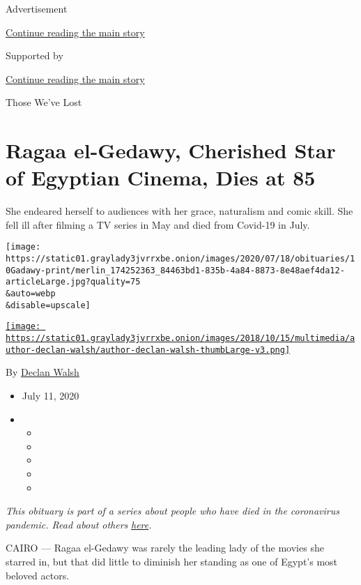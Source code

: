 Advertisement

\protect\hyperlink{after-top}{Continue reading the main story}

Supported by

\protect\hyperlink{after-sponsor}{Continue reading the main story}

Those We've Lost

\hypertarget{ragaa-el-gedawy-cherished-star-of-egyptian-cinema-dies-at-85}{%
\section{Ragaa el-Gedawy, Cherished Star of Egyptian Cinema, Dies at
85}\label{ragaa-el-gedawy-cherished-star-of-egyptian-cinema-dies-at-85}}

She endeared herself to audiences with her grace, naturalism and comic
skill. She fell ill after filming a TV series in May and died from
Covid-19 in July.

\texttt{[image: https://static01.graylady3jvrrxbe.onion/images/2020/07/18/obituaries/10Gadawy-print/merlin\_174252363\_84463bd1-835b-4a84-8873-8e48aef4da12-articleLarge.jpg?quality=75\\\&auto=webp\\\&disable=upscale]}

\href{https://www.nytimes3xbfgragh.onion/by/declan-walsh}{\texttt{[image: https://static01.graylady3jvrrxbe.onion/images/2018/10/15/multimedia/author-declan-walsh/author-declan-walsh-thumbLarge-v3.png]}}

By \href{https://www.nytimes3xbfgragh.onion/by/declan-walsh}{Declan
Walsh}

\begin{itemize}
\item
  July 11, 2020
\item
  \begin{itemize}
  \item
  \item
  \item
  \item
  \item
  \end{itemize}
\end{itemize}

\emph{This obituary is part of a series about people who have died in
the coronavirus pandemic. Read about others}
\href{https://www.nytimes3xbfgragh.onion/interactive/2020/obituaries/people-died-coronavirus-obituaries.html}{\emph{here}}\emph{.}

CAIRO --- Ragaa el-Gedawy was rarely the leading lady of the movies she
starred in, but that did little to diminish her standing as one of
Egypt's most beloved actors.

